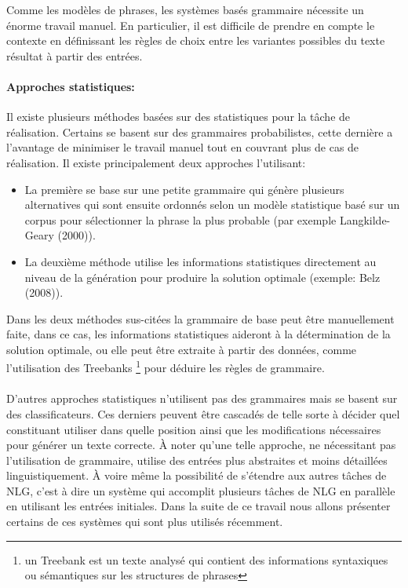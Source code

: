 Comme les modèles de phrases, les systèmes basés grammaire nécessite un énorme travail manuel. En particulier, il est difficile de prendre en compte le contexte en définissant les règles de choix entre les variantes possibles du texte résultat à partir des entrées\cite{Gatt2018}.

\paragraph{Approches statistiques:} Il existe plusieurs méthodes basées sur des statistiques pour la tâche de réalisation. Certains se basent sur des grammaires probabilistes, cette dernière a l’avantage de minimiser le travail manuel tout en couvrant plus de cas de réalisation. Il existe principalement deux approches l’utilisant\cite{Gatt2018}:
\begin{itemize}
	\item La première se base sur une petite grammaire qui génère plusieurs alternatives qui sont ensuite ordonnés selon un modèle statistique basé sur un corpus pour sélectionner la phrase la plus probable (par exemple Langkilde-Geary (2000)\cite{LangkildeGeary2000}).
	\item La deuxième méthode utilise les informations statistiques directement au niveau de la génération pour produire la solution optimale (exemple: Belz (2008)\cite{Belz2008}).
\end{itemize}
	Dans les deux méthodes sus-citées la grammaire de base peut être manuellement faite, dans ce cas, les informations statistiques aideront à la détermination de la solution optimale, ou elle peut être extraite à partir des données, comme l’utilisation des Treebanks \footnote{un Treebank est un texte analysé qui contient des informations syntaxiques ou sémantiques sur les structures de phrases} pour déduire les règles de grammaire\cite{Espinosa2008}.\newline
\paragraph{}
D’autres approches statistiques n’utilisent pas des grammaires mais se basent sur des classificateurs. Ces derniers peuvent être cascadés de telle sorte à décider quel constituant utiliser dans quelle position ainsi que les modifications nécessaires pour générer un texte correcte. À noter qu’une telle approche, ne nécessitant pas l’utilisation de grammaire, utilise des entrées plus abstraites et moins détaillées linguistiquement. À voire même la possibilité de s’étendre aux autres tâches de NLG, c’est à dire un système qui accomplit plusieurs tâches de NLG en parallèle en utilisant les entrées initiales. Dans la suite de ce travail nous allons présenter certains de ces systèmes qui sont plus utilisés récemment.

